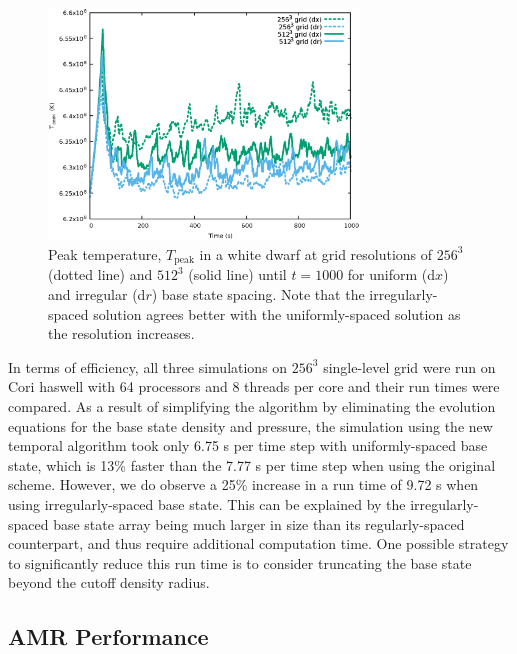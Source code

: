 \begin{figure}[hbt]
\begin{center}
\includegraphics[width=3.25in]{./figs/wdconvect_compare_Tmax}
\caption{\label{fig:wdconvect_Tmax} Peak temperature, $T_{\text{peak}}$  in a white dwarf at grid resolutions of
         $256^3$ (dotted line) and $512^3$ (solid line) until $t=1000$ for uniform (d$x$) and irregular (d$r$) base state spacing.
         Note that the irregularly-spaced solution agrees better
         with the uniformly-spaced solution as the resolution increases.}
\end{center}
\end{figure}

In terms of efficiency, all three simulations on $256^3$ single-level grid were run on Cori haswell with 64 processors and 8 threads per core and their run times were compared. As a result of simplifying the algorithm by eliminating the evolution equations for the base state density and pressure, the simulation using the new temporal algorithm took only 6.75 s per time step with uniformly-spaced base state, which is 13\% faster than the 7.77 s per time step when using the original scheme. However, we do observe a 25\% increase in a run time of 9.72 s when using irregularly-spaced base state. This can be explained by the irregularly-spaced base state array being much larger in size than its regularly-spaced counterpart, and thus require additional computation time. One possible strategy to significantly reduce this run time is to consider truncating the base state beyond the cutoff density radius.


\subsection{AMR Performance}

